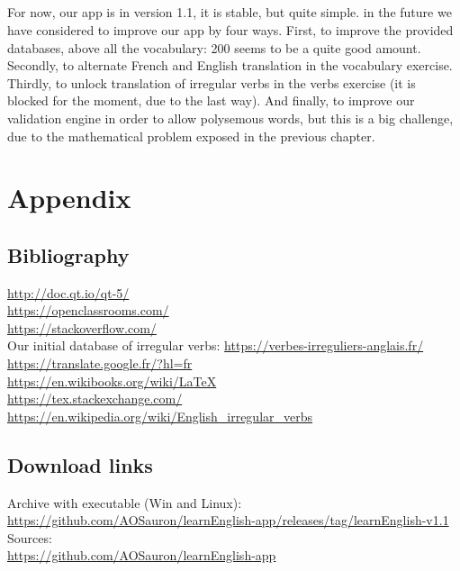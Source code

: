 \documentclass[12pt, a4paper]{report}
\begin{document}
\paragraph{}For now, our app is in version 1.1, it is stable, but quite simple. in the future we have considered to improve our app by four ways. First, to improve the provided databases, above all the vocabulary: 200 seems to be a quite good amount. Secondly, to alternate French and English translation in the vocabulary exercise. Thirdly, to unlock translation of irregular verbs in the verbs exercise (it is blocked for the moment, due to the last way). And finally, to improve our validation engine in order to allow polysemous words, but this is a big challenge, due to the mathematical problem exposed in the previous chapter.

\newpage
\chapter*{Appendix}

\section*{\hspace{0.6cm}Bibliography}


\hspace{0.6cm}\url{http://doc.qt.io/qt-5/}\\

\url{https://openclassrooms.com/}\\

\url{https://stackoverflow.com/}\\

Our initial database of irregular verbs:
\url{https://verbes-irreguliers-anglais.fr/}\\

\url{https://translate.google.fr/?hl=fr}\\

\url{https://en.wikibooks.org/wiki/LaTeX}\\

\url{https://tex.stackexchange.com/}\\

\url{https://en.wikipedia.org/wiki/English_irregular_verbs}\\

\section*{\hspace{0.6cm}Download links}

\hspace{0.6cm}Archive with executable (Win and Linux):\\ 
\footnotesize{\url{https://github.com/AOSauron/learnEnglish-app/releases/tag/learnEnglish-v1.1}}\\

\normalsize{Sources:}\\
\footnotesize \url{https://github.com/AOSauron/learnEnglish-app}\\
\end{document}
